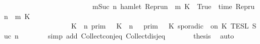 \begin{isabellebody}
\ \ \ \ \ \ \ \ \ \ \ \ \ \ \ \ \ \ \ \ \ \ \ \ {\isasymor}\ {\isacharparenleft}{\isasymexists}m{\isasymge}Suc\ n{\isachardot}\ hamlet\ {\isacharparenleft}{\isacharparenleft}Rep{\isacharunderscore}run\ {\isasymrho}{\isacharparenright}\ m\ K\ {\isacharequal}\ True\ {\isasymand}\ time\ {\isacharparenleft}{\isacharparenleft}Rep{\isacharunderscore}run\ {\isasymrho}{\isacharparenright}\ m\ K\ {\isacharequal}\ {\isasymtau}{\isacharparenright}\ {\isacharbraceright}\isanewline
\ \ \ \ \ \ \ \ \ \ \ \ \ \ \ \ \ {\isacharequal}\ {\isasymlbrakk}\ K\ {\isasymUp}\ n\ {\isasymrbrakk}\isactrlsub p\isactrlsub r\isactrlsub i\isactrlsub m\ {\isasyminter}\ {\isasymlbrakk}\ K\ {\isasymDown}\ n\ {\isacharat}\ {\isasymtau}\ {\isasymrbrakk}\isactrlsub p\isactrlsub r\isactrlsub i\isactrlsub m\ {\isasymunion}\ {\isasymlbrakk}\ K\ sporadic\ {\isasymtau}\ on\ K\ {\isasymrbrakk}\isactrlsub T\isactrlsub E\isactrlsub S\isactrlsub L\isactrlbsup {\isasymge}\ Suc\ n\isactrlesup {\isacartoucheclose}\isanewline
\ \ \ \ \ \ \isamarkupfalse%
\ {\isacharparenleft}simp\ add{\isacharcolon}\ Collect{\isacharunderscore}conj{\isacharunderscore}eq\ Collect{\isacharunderscore}disj{\isacharunderscore}eq{\isacharparenright}\isanewline
\ \ \ \ \isamarkupfalse%
\ \isamarkupfalse%
\ {\isacharquery}thesis\ \isamarkupfalse%
\ auto\isanewline
\ \ \isamarkupfalse%
\isanewline
\isanewline
%
\end{isabellebody}
